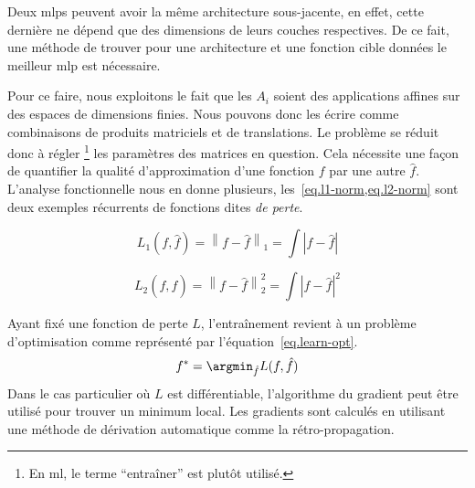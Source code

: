 Deux \glspl{mlp} peuvent avoir la même architecture sous-jacente,
en effet, cette dernière ne dépend que des dimensions de leurs couches respectives.
De ce fait, une méthode de trouver pour une architecture et une fonction cible données 
le meilleur \gls{mlp} est nécessaire.

Pour ce faire, nous exploitons le fait que 
les \(A_i\) soient des applications affines sur des espaces de dimensions finies.
Nous pouvons donc les écrire comme combinaisons de produits matriciels et de translations.
Le problème se réduit donc à régler \footnote{En \gls{ml}, le terme ``entraîner'' est plutôt utilisé.}
les paramètres des matrices en question. 
Cela nécessite une façon de quantifier la qualité d'approximation d'une fonction \(f\) par une autre \(\hat{f}\).
L'analyse fonctionnelle nous en donne plusieurs, les~\cref{eq.l1-norm,eq.l2-norm}
sont deux exemples récurrents de fonctions dites \emph{de perte}.

\begin{equation}
    \label{eq.l1-norm}
    L_1(f, \hat{f}) = \left\|f - \hat{f}\right\|_1 = \int \left|f - \hat{f}\right|
\end{equation}

\begin{equation}
    \label{eq.l2-norm}
    L_2(f, \hat{f}) = \left\|f - \hat{f}\right\|_2^2 = \int \left|f - \hat{f}\right|^2
\end{equation}

Ayant fixé une fonction de perte \(L\), 
l'entraînement revient à un problème d'optimisation comme représenté par l'équation~\ref{eq.learn-opt}.
\begin{equation}
    \label{eq.learn-opt}
    f^\ast = \argmin_{\hat{f}}{L(f, \hat{f})}
\end{equation}
Dans le cas particulier où \(L\) est différentiable, 
l'algorithme du gradient peut être utilisé pour trouver un minimum local.
Les gradients sont calculés en utilisant une méthode de dérivation automatique comme la rétro-propagation.
